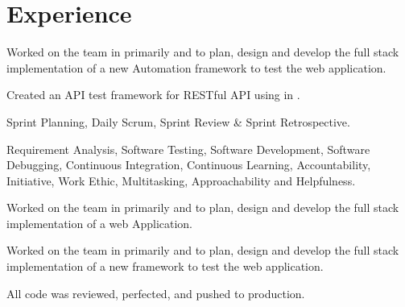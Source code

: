 \documentclass[]{aj-resume-openfont}
\begin{document}
\begin{minipage}[t]{0.66\textwidth} 


\section{Experience}

\vspace{\topsep} %
\begin{tightemize}
\item Worked on the \href{https://www.xpo.com/solutions/transportation/last-mile}{} team in primarily  and  to plan, design and develop the full stack implementation of a new Automation framework to test the web application.
\item Created an API test framework for RESTful API using  in .
\item Sprint Planning, Daily Scrum, Sprint Review \& Sprint Retrospective.
\item Requirement Analysis, Software Testing, Software Development, Software Debugging, Continuous Integration, Continuous Learning, Accountability, Initiative, Work Ethic, Multitasking, Approachability and Helpfulness.
\end{tightemize}
\sectionsep

\begin{tightemize}
\item Worked on the  team in primarily  and  to plan, design and develop the full stack implementation of a web Application.
\item Worked on the   team in primarily  and  to plan, design and develop the full stack implementation of a new framework to test the web application.
\item All code was reviewed, perfected, and pushed to production.
\end{tightemize}
\sectionsep


\end{minipage}
\end{document}
